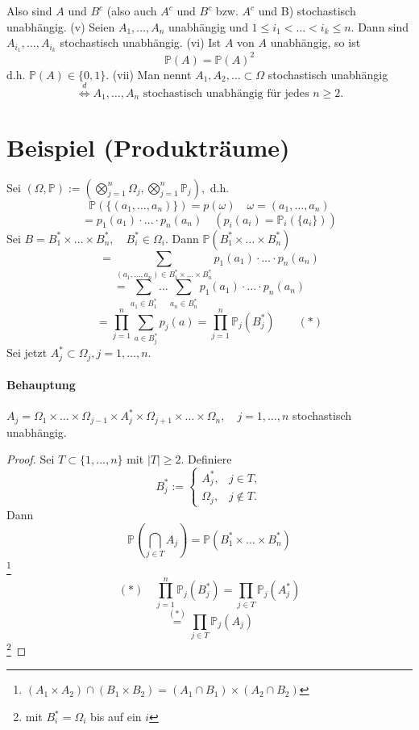 \documentclass[a4paper,11pt,notitlepage]{report}
\newcommand{\Prim}{{\ensuremath{\mathbb{P}}}}
\begin{document}
Also sind $A$ und $B^c$ (also auch $A^c$ und $B^c$ bzw. $A^c$ und B) stochastisch unabhängig.
\newline
(v) Seien $A_1, \ldots, A_n$ unabhängig und $1 \leq i_1 < \ldots < i_k \leq n$. Dann sind $A_{i_1}, \ldots, A_{i_k}$ stochastisch unabhängig.
\newline
(vi) Ist $A$ von $A$ unabhängig, so ist 
$$\Prim(A)=\Prim(A)^2$$
d.h. $\Prim(A) \in \{0,1\}$.
\newline
(vii) Man nennt $A_1, A_2, \ldots \subset \Omega$ stochastisch unabhängig
$$\overset{d}{\Leftrightarrow} A_1, \ldots, A_n \text{ stochastisch unabhängig für jedes } n \geq 2.$$

\section{Beispiel (Produkträume)}
Sei $(\Omega, \Prim):= (\bigotimes\limits_{j=1}^{n}\Omega_j, \bigotimes\limits_{j=1}^n{\Prim_j}),$
d.h. $$\Prim(\{(a_1, \ldots, a_n)\})=p(\omega) \quad \omega=(a_1, \ldots, a_n)$$
$$= p_1(a_1) \cdot \ldots \cdot p_n(a_n) \quad (p_i(a_i)=\Prim_i(\{a_i\}))$$
Sei $B = B_1^* \times \ldots \times B_n^*, \quad B_i^* \in \Omega_i$.
Dann $\Prim(B_1^* \times \ldots \times B_n^*)$
$$= \sum\limits_{(a_1,\ldots,a_n)\in B_1^* \times \ldots \times B_n^*}{p_1(a_1) \cdot \ldots \cdot p_n(a_n)}$$
$$= \sum\limits_{a_1 \in B_1^*}{\ldots \sum\limits_{a_n \in B_n^*}{p_1(a_1)\cdot \ldots \cdot p_n(a_n)}}$$
$$= \prod\limits_{j=1}^n{\sum\limits_{a \in B_j^*}{p_j(a)}} = \prod\limits_{j=1}^n{\Prim_j(B_j^*)} \qquad (*)$$
Sei jetzt $A_j^* \subset \Omega_j, j=1,\ldots,n.$
\paragraph{Behauptung}
$A_j = \Omega_1 \times \ldots \times \Omega_{j-1} \times A_j^* \times \Omega_{j+1} \times \ldots \times \Omega_n, \quad j=1, \ldots, n$ stochastisch unabhängig.
\begin{proof}
	Sei $T \subset \{1,\ldots,n\}$ mit $|T| \geq 2$.
	\newline
	Definiere $$B_j^*:=\begin{cases}
		A_j^*, & j \in T, \\ \Omega_j, & j \notin T.
	\end{cases}$$
	Dann 
	$$\Prim(\bigcap\limits_{j \in T}{A_j}) = \Prim(B_1^* \times \ldots \times B_n^*)$$
	\footnote{$(A_1 \times A_2) \cap (B_1 \times B_2) = (A_1 \cap B_1) \times (A_2 \cap B_2)$}
	$$(*) \quad \prod\limits_{j=1}^n{\Prim_j(B_j^*)}= \prod\limits_{j \in T}{\Prim_j(A_j^*)}$$
	$$\overset{(*)}{=} \prod\limits_{j \in T}{\Prim_j(A_j)}$$ \footnote{mit $B_i^*=\Omega_i$ bis auf ein $i$}
\end{proof}
\end{document}
